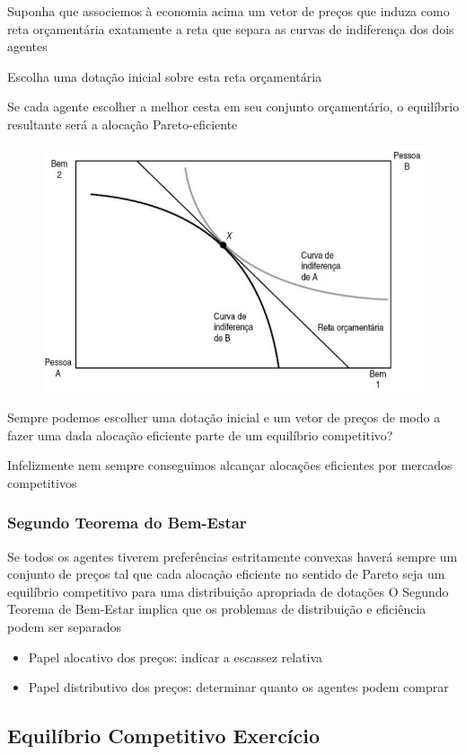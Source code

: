 \documentclass[a4paper,12pt]{article}[abntex2]
\begin{document}
Suponha que associemos à economia acima um vetor de preços que induza como reta orçamentária exatamente a reta que separa as curvas de indiferença dos dois agentes

Escolha uma dotação inicial sobre esta reta orçamentária

Se cada agente escolher a melhor cesta em seu conjunto orçamentário, o equilíbrio resultante será a alocação Pareto-eficiente

\begin{figure}[H]
    \centering
    \includegraphics[width=0.70\linewidth]{Imagens/a2i9.png}
\end{figure}

Sempre podemos escolher uma dotação inicial e um vetor de preços de modo a fazer uma dada alocação eficiente parte de um equilíbrio competitivo?

Infelizmente nem sempre conseguimos alcançar alocações eficientes por mercados competitivos

\subsubsection{\textbf{Segundo Teorema do Bem-Estar}}

Se todos os agentes tiverem preferências estritamente convexas haverá sempre um conjunto de preços tal que cada alocação eficiente no sentido de Pareto seja um equilíbrio competitivo para uma distribuição apropriada de dotações
O Segundo Teorema de Bem-Estar implica que os problemas de distribuição e eficiência podem ser separados\begin{itemize}
    \item Papel alocativo dos preços: indicar a escassez relativa
    \item Papel distributivo dos preços: determinar quanto os agentes podem comprar
\end{itemize}

\subsection{\textbf{Equilíbrio Competitivo Exercício}}
\end{document}

